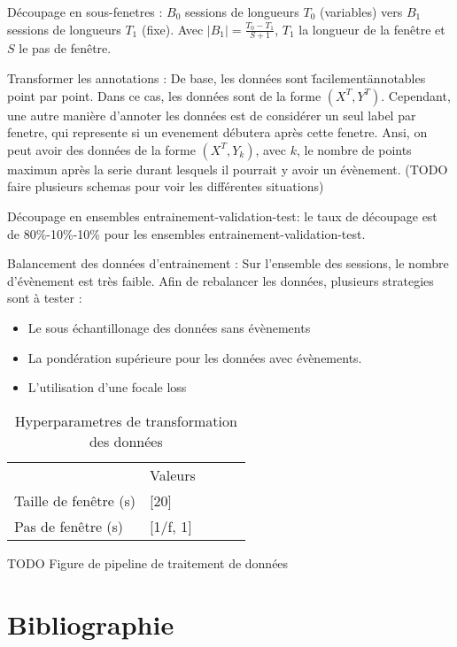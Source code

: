 \documentclass{article}
\begin{document}
    Découpage en sous-fenetres : $B_0$ sessions de longueurs $T_0$ (variables) vers $B_1$ sessions de longueurs $T_1$ (fixe). Avec $|B_1| = \frac{T_0-T_1}{S+1}$, $T_1$ la longueur de la fenêtre et $S$ le pas de fenêtre.

    Transformer les annotations : De base, les données sont \"facilement\" annotables point par point. Dans ce cas, les données sont de la forme $(X^T, Y^T)$. Cependant, une autre manière d'annoter les données est de considérer un seul label par fenetre, qui represente si un evenement débutera après cette fenetre. Ansi, on peut avoir des données de la forme $(X^T, Y_k)$, avec $k$, le nombre de points maximun après la serie durant lesquels il pourrait y avoir un évènement. (TODO faire plusieurs schemas pour voir les différentes situations)

    Découpage en ensembles entrainement-validation-test: le taux de découpage est de 80\%-10\%-10\% pour les ensembles entrainement-validation-test.

    Balancement des données d'entrainement : Sur l'ensemble des sessions, le nombre d'évènement est très faible. Afin de rebalancer les données, plusieurs strategies sont à tester :
    \begin{itemize}
        \item Le sous échantillonage des données sans évènements
        \item La pondération supérieure pour les données avec évènements.
        \item L'utilisation d'une focale loss
    \end{itemize}

    \begin{table}[]
    \begin{tabular}{l|l|lll}
    \cline{2-2}
                                                & Valeurs      &  &  &  \\ \cline{1-2}
    \multicolumn{1}{|l|}{Taille de fenêtre (s)} & {[}20{]}     &  &  &  \\ \cline{1-2}
    \multicolumn{1}{|l|}{Pas de fenêtre (s)}    & {[}1/f, 1{]} &  &  &  \\ \cline{1-2}
    \end{tabular}
    \caption{Hyperparametres de transformation des données}
    \end{table}

    TODO Figure de pipeline de traitement de données

    \section{Bibliographie}
\end{document}
